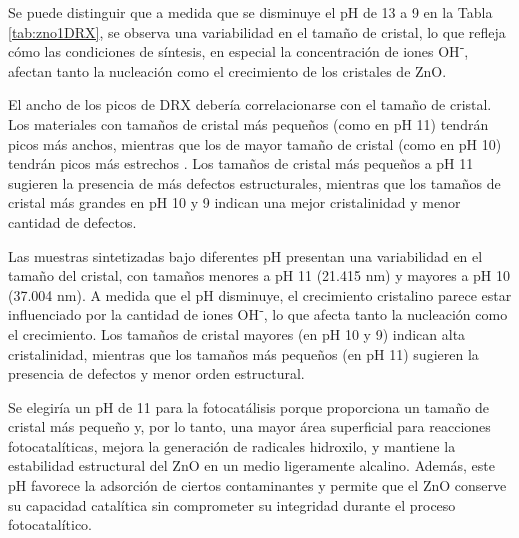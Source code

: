 \documentclass[12pt]{article}
\begin{document}
Se puede distinguir que a medida que se disminuye el pH de 13 a 9 en la Tabla \ref{tab:zno1DRX}, se observa una variabilidad en el tamaño de cristal, lo que refleja cómo las condiciones de síntesis, en especial la concentración de iones OH⁻, afectan tanto la nucleación como el crecimiento de los cristales de ZnO.\vspace{1em} %

El ancho de los picos de DRX debería correlacionarse con el tamaño de cristal. Los materiales con tamaños de cristal más pequeños (como en pH 11) tendrán picos más anchos, mientras que los de mayor tamaño de cristal (como en pH 10) tendrán picos más estrechos \cite{IEEEreferencias:Scherrer}.
Los tamaños de cristal más pequeños a pH 11 sugieren la presencia de más defectos estructurales, mientras que los tamaños de cristal más grandes en pH 10 y 9 indican una mejor cristalinidad y menor cantidad de defectos.\vspace{1em} %

Las muestras sintetizadas bajo diferentes pH presentan una variabilidad en el tamaño del cristal, con tamaños menores a pH 11 (21.415 nm) y mayores a pH 10 (37.004 nm). A medida que el pH disminuye, el crecimiento cristalino parece estar influenciado por la cantidad de iones OH⁻, lo que afecta tanto la nucleación como el crecimiento. Los tamaños de cristal mayores (en pH 10 y 9) indican alta cristalinidad, mientras que los tamaños más pequeños (en pH 11) sugieren la presencia de defectos y menor orden estructural.\vspace{1em} %


Se elegiría un pH de 11 para la fotocatálisis porque proporciona un tamaño de cristal más pequeño y, por lo tanto, una mayor área superficial para reacciones fotocatalíticas, mejora la generación de radicales hidroxilo, y mantiene la estabilidad estructural del ZnO en un medio ligeramente alcalino. Además, este pH favorece la adsorción de ciertos contaminantes y permite que el ZnO conserve su capacidad catalítica sin comprometer su integridad durante el proceso fotocatalítico.
\end{document}
